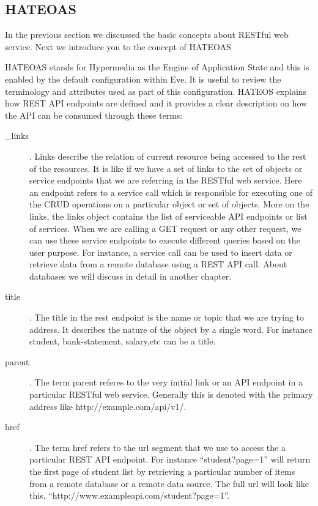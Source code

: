 \subsection{HATEOAS}\label{s:hateoas}

In the previous section we discussed the basic concepts about RESTful
web service. Next we introduce you to the concept of HATEOAS

HATEOAS stands for Hypermedia as the Engine of Application State and
this is enabled by the default configuration within Eve. It is useful
to review the terminology and attributes used as part of this
configuration. HATEOS explains how REST API endpoints are defined and it
provides a clear description on how the API can be consumed through
these terms:

\begin{description} 

\item [\_links]. Links describe the relation of current resource being
  accessed to the rest of the resources. It is like if we have a set
  of links to the set of objects or service endpoints that we are
  referring in the RESTful web service. Here an endpoint refers to a
  service call which is responsible for executing one of the CRUD
  operations on a particular object or set of objects. More on the
  links, the links object contains the list of serviceable API endpoints
  or list of services.  When we are calling a GET request or any other
  request, we can use these service endpoints to execute different
  queries based on the user purpose.  For instance, a service call can
  be used to insert data or retrieve data from a remote database using
  a REST API call. About databases we will discuss in detail in another
  chapter.

\item [title]. The title in the rest endpoint is the name or topic
  that we are trying to address. It describes the nature of the object
  by a single word. For instance student, bank-statement, salary,etc
  can be a title.

\item [parent]. The term parent referes to the very initial link or an
  API endpoint in a particular RESTful web service. Generally this is
  denoted with the primary address like http://example.com/api/v1/.

\item [href]. The term href refers to the url segment that we use to
  access the a particular REST API endpoint. For instance
  ``student?page=1'' will return the first page of student list by
  retrieving a particular number of items from a remote database or a
  remote data source. The full url will look like this,
  ``http://www.exampleapi.com/student?page=1''.

\end{description}  

